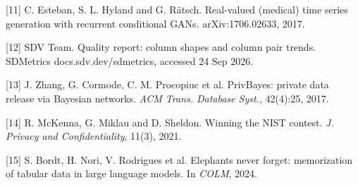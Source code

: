 \documentclass[10pt,a4paper,twocolumn]{article}
\begin{document}
[11] C. Esteban, S. L. Hyland and G. Rätsch. Real-valued (medical) time series
generation with recurrent conditional GANs. arXiv:1706.02633, 2017.



[12] SDV Team. Quality report: column shapes and column pair trends. SDMetrics
docs.sdv.dev/sdmetrics, accessed 24 Sep 2026.



[13] J. Zhang, G. Cormode, C. M. Procopiuc et al. PrivBayes: private data release
via Bayesian networks. \textit{ACM Trans. Database Syst.}, 42(4):25, 2017.



[14] R. McKenna, G. Miklau and D. Sheldon. Winning the NIST contest. \textit{J. Privacy and Confidentiality}, 11(3), 2021.



[15] S. Bordt, H. Nori, V. Rodrigues et al. Elephants never forget: memorization of
tabular data in large language models. In \textit{COLM}, 2024.
\end{document}
